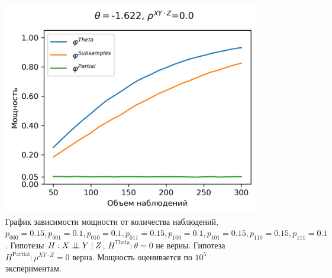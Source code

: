 \begin{figure}[H]
    \centering
    \includegraphics[scale=0.65]{images/graph4.png}
    \caption{График зависимости мощности от количества наблюдений,
    $p_{000}=0.15, p_{001}=0.1, 
    p_{010}=0.1, p_{011}=0.15,
    p_{100}=0.1, p_{101}=0.15, p_{110}=0.15, p_{111}=0.1$. 
    Гипотезы $H: X \perp\!\!\!\perp Y \mid Z$,
    $H^{\text{Theta}}: \theta=0$ не верны.
    Гипотеза $H^{\text{Partial}}: \rho^{XY\cdot Z}=0$ верна.
    Мощность оценивается по $10^5$ экспериментам.} \label{fig:4}
\end{figure}



